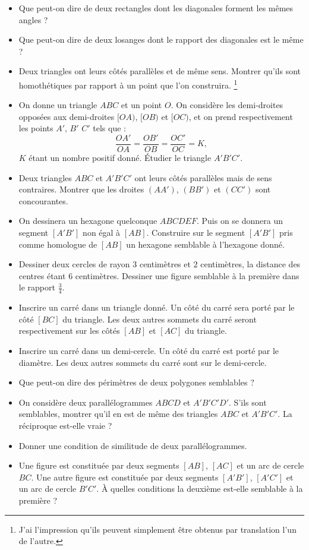 \documentclass[12 pt]{report}
\theoremstyle{plain}
\newcounter{n}
\renewcommand{\it}{\item[$\mathbf{\then}.$]\stepcounter{n} }
\begin{document}
 \begin{itemize}
 \it Que peut-on dire de deux rectangles dont les diagonales forment les mêmes angles ? 
 \it Que peut-on dire de deux losanges dont le rapport des diagonales est le même ? 
 \it Deux triangles ont leurs côtés parallèles et de même sens. Montrer qu'ils sont homothétiques par rapport à un point que l'on construira. \footnote{J'ai l'impression qu'ils peuvent simplement être obtenus par translation l'un de l'autre.}
 \it On donne un triangle $ABC$ et un point $O$. On considère les demi-droites opposées aux demi-droites $[OA)$, $[OB)$ et $[OC)$, et on prend respectivement les points $A'$, $B'$ $C'$ tels que : 
 \[ \frac{OA'}{OA} = \frac{OB'}{OB} = \frac{OC'}{OC} = K,\]
 $K$ étant un nombre positif donné. Étudier le triangle $A'B'C'$. 
 \it Deux triangles $ABC$ et $A'B'C'$ ont leurs côtés parallèles mais de sens contraires. Montrer que les droites $(AA')$, $(BB')$ et $(CC')$ sont concourantes. 
 \it On dessinera un hexagone quelconque $ABCDEF$. Puis on se donnera un segment $[A'B']$ non égal à $[AB]$. Construire sur le segment $[A'B']$ pris comme homologue de $[AB]$ un hexagone semblable à l'hexagone donné.
 \it Dessiner deux cercles de rayon $3$ centimètres et $2$ centimètres, la distance des centres étant $6$ centimètres. Dessiner une figure semblable à la première dans le rapport $\frac34$. 
 \it Inscrire un carré dans un triangle donné. Un côté du carré sera porté par le côté $[BC]$ du triangle. Les deux autres sommets du carré seront respectivement sur les côtés $[AB]$ et $[AC]$ du triangle. 
 \it Inscrire un carré dans un demi-cercle. Un côté du carré est porté par le diamètre. Les deux autres sommets du carré sont sur le demi-cercle. 
 \it Que peut-on dire des périmètres de deux polygones semblables ? 
 \it On considère deux parallélogrammes $ABCD$ et $A'B'C'D'$. S'ils sont semblables, montrer qu'il en est de même des triangles $ABC$ et $A'B'C'$. La réciproque est-elle vraie ? 
 \it Donner une condition de similitude de deux parallélogrammes. 
 \it Une figure est constituée par deux segments $[AB]$, $[AC]$ et un arc de cercle $BC$. Une autre figure est constituée par deux segments $[A'B']$, $[A'C']$ et un arc de cercle $B'C'$. À quelles conditions la deuxième est-elle semblable à la première ? 
 \end{itemize}
 
\end{document}
